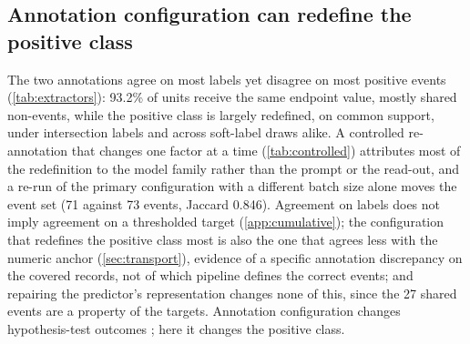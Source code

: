 \documentclass[11pt]{article}
\begin{document}
\subsection{Annotation configuration can redefine the positive class}
\label{sec:annot}
The two annotations agree on most labels yet disagree on most positive events (\cref{tab:extractors}): 93.2\% of units receive the same
endpoint value, mostly shared non-events, while the positive class is largely redefined, on common
support, under intersection labels and across soft-label draws alike. A controlled re-annotation
that changes one factor at a time (\cref{tab:controlled}) attributes most of the redefinition to
the model family rather than the prompt or the read-out, and a re-run of the primary configuration
with a different batch size alone moves the event set (71 against 73 events, Jaccard 0.846).
Agreement on labels does not imply agreement on a thresholded target (\cref{app:cumulative}); the
configuration that redefines the positive class most is also the one that agrees less with the
numeric anchor (\cref{sec:transport}), evidence of a specific annotation discrepancy on the covered
records, not of which pipeline defines the correct events; and repairing the predictor's
representation changes none of this, since the 27 shared events are a property of the targets.
Annotation configuration changes hypothesis-test outcomes \citep{Baumann2025}; here it changes the
positive class.

\begin{table}[!t]\centering\scriptsize
\setlength{\tabcolsep}{2pt}
\caption{Positive events under each annotation of the same 1{,}012 units (label agreement 67.0\%, $\kappa=0.52$; pooled directions $r=0.943$; \cref{app:reextract}). ``Shared'' and Jaccard are relative to the primary
annotation; ``Sparse'': events on histories with fewer than eight signed records; ``Prim.-trained'': the primary-trained score evaluated unchanged against each endpoint.}
\label{tab:extractors}
\end{table}
\end{document}
